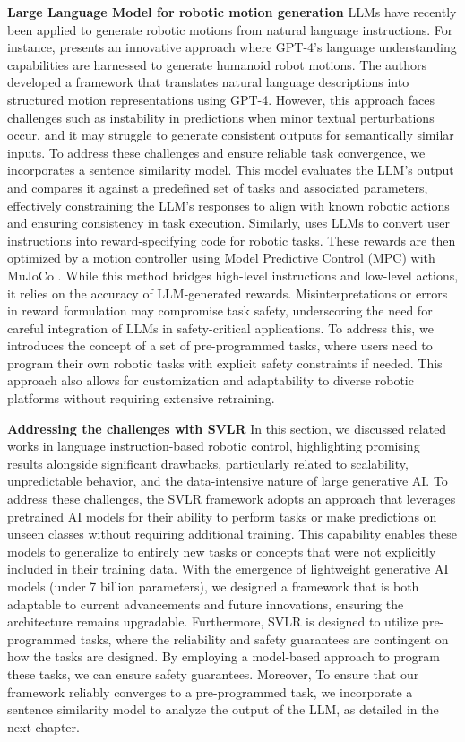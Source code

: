 \textbf{Large Language Model for robotic motion generation} LLMs have recently been applied to generate robotic motions from natural language instructions. For instance, \cite{alter3} presents an innovative approach where GPT-4's \cite{gpt4} language understanding capabilities are harnessed to generate humanoid robot motions. The authors developed a framework that translates natural language descriptions into structured motion representations using GPT-4. However, this approach faces challenges such as instability in predictions when minor textual perturbations occur, and it may struggle to generate consistent outputs for semantically similar inputs. To address these challenges and ensure reliable task convergence, we incorporates a sentence similarity model. This model evaluates the LLM's output and compares it against a predefined set of tasks and associated parameters, effectively constraining the LLM's responses to align with known robotic actions and ensuring consistency in task execution.
Similarly, \cite{langreward} uses LLMs to convert user instructions into reward-specifying code for robotic tasks. These rewards are then optimized by a motion controller using Model Predictive Control (MPC) with MuJoCo \cite{mujoco}. While this method bridges high-level instructions and low-level actions, it relies on the accuracy of LLM-generated rewards. Misinterpretations or errors in reward formulation may compromise task safety, underscoring the need for careful integration of LLMs in safety-critical applications. To address this, we introduces the concept of a set of pre-programmed tasks, where users need to program their own robotic tasks with explicit safety constraints if needed. This approach also allows for customization and adaptability to diverse robotic platforms without requiring extensive retraining.

\textbf{Addressing the challenges with SVLR} In this section, we discussed related works in language instruction-based robotic control, highlighting promising results alongside significant drawbacks, particularly related to scalability, unpredictable behavior, and the data-intensive nature of large generative AI. To address these challenges, the SVLR framework adopts an approach that leverages pretrained AI models for their ability to perform tasks or make predictions on unseen classes without requiring additional training. This capability enables these models to generalize to entirely new tasks or concepts that were not explicitly included in their training data. With the emergence of lightweight generative AI models (under 7 billion parameters), we designed a framework that is both adaptable to current advancements and future innovations, ensuring the architecture remains upgradable. Furthermore, SVLR is designed to utilize pre-programmed tasks, where the reliability and safety guarantees are contingent on how the tasks are designed. By employing a model-based approach to program these tasks, we can ensure safety guarantees. Moreover, To ensure that our framework reliably converges to a pre-programmed task, we incorporate a sentence similarity model to analyze the output of the LLM, as detailed in the next chapter.